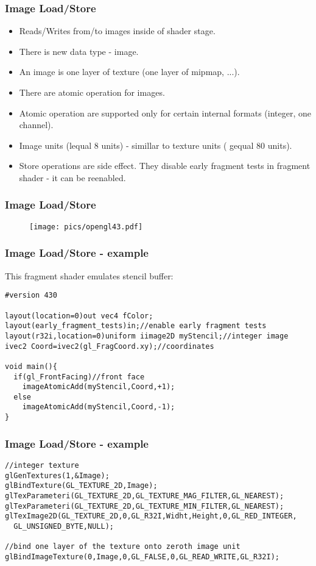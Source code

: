 \begin{frame}
\frametitle{Image Load/Store}
	\begin{itemize}
	\item Reads/Writes from/to images inside of shader stage.
	\item There is new data type - image.
  \item An image is one layer of texture (one layer of mipmap, ...).
	\item There are atomic operation for images.
  \item Atomic operation are supported only for certain internal formats (integer, one channel).
  \item Image units (lequal 8 units) - simillar to texture units ( gequal 80 units).
	\item Store operations are side effect. They disable early fragment tests in fragment shader - it can be reenabled.
	\end{itemize}
\end{frame}

\begin{frame}
\frametitle{Image Load/Store}
	\begin{figure}[h]
	\texttt{[image: pics/opengl43.pdf]}
	\end{figure}
\end{frame}

\begin{frame}[fragile]
\frametitle{Image Load/Store - example}
  This fragment shader emulates stencil buffer:
	{\scriptsize
	\begin{verbatim}
#version 430

layout(location=0)out vec4 fColor;
layout(early_fragment_tests)in;//enable early fragment tests
layout(r32i,location=0)uniform iimage2D myStencil;//integer image
ivec2 Coord=ivec2(gl_FragCoord.xy);//coordinates

void main(){
  if(gl_FrontFacing)//front face
    imageAtomicAdd(myStencil,Coord,+1);
  else
    imageAtomicAdd(myStencil,Coord,-1);
}
	\end{verbatim}
	}
\end{frame}

\begin{frame}[fragile]
\frametitle{Image Load/Store - example}
	{\scriptsize
	\begin{verbatim}
//integer texture
glGenTextures(1,&Image);
glBindTexture(GL_TEXTURE_2D,Image);
glTexParameteri(GL_TEXTURE_2D,GL_TEXTURE_MAG_FILTER,GL_NEAREST);
glTexParameteri(GL_TEXTURE_2D,GL_TEXTURE_MIN_FILTER,GL_NEAREST);
glTexImage2D(GL_TEXTURE_2D,0,GL_R32I,Widht,Height,0,GL_RED_INTEGER,
  GL_UNSIGNED_BYTE,NULL);

//bind one layer of the texture onto zeroth image unit
glBindImageTexture(0,Image,0,GL_FALSE,0,GL_READ_WRITE,GL_R32I);

  \end{verbatim}
	}
\end{frame}

